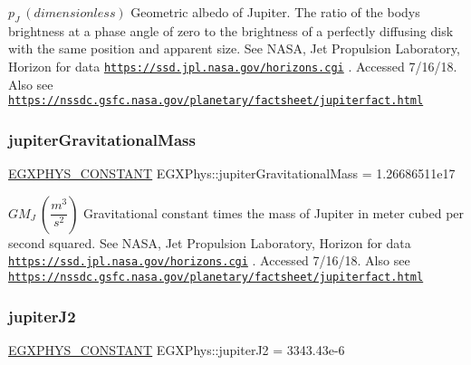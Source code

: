 $ p_{J} \ (dimensionless)$ Geometric albedo of Jupiter. The ratio of the body\textquotesingle{}s brightness at a phase angle of zero to the brightness of a perfectly diffusing disk with the same position and apparent size. See N\+A\+SA, Jet Propulsion Laboratory, Horizon for data \href{https://ssd.jpl.nasa.gov/horizons.cgi}{\tt https\+://ssd.\+jpl.\+nasa.\+gov/horizons.\+cgi} . Accessed 7/16/18. Also see \href{https://nssdc.gsfc.nasa.gov/planetary/factsheet/jupiterfact.html}{\tt https\+://nssdc.\+gsfc.\+nasa.\+gov/planetary/factsheet/jupiterfact.\+html} \mbox{\label{group___e_g_x_phys-_constants-_astrophysics-_solar_system-_jupiter-_bulk_ga6489d5b6886e19c3adf729fd28f54b46}} 
\subsubsection{\texorpdfstring{jupiter\+Gravitational\+Mass}{jupiterGravitationalMass}}
{\footnotesize\ttfamily \mbox{\hyperlink{group___e_g_x_phys-_constants-_macros_ga76980d288494ce1714c9ac68a95ba702}{E\+G\+X\+P\+H\+Y\+S\+\_\+\+C\+O\+N\+S\+T\+A\+NT}} E\+G\+X\+Phys\+::jupiter\+Gravitational\+Mass = 1.\+26686511e17}

$ GM_{J} \ (\dfrac{m^3}{s^2})$ Gravitational constant times the mass of Jupiter in meter cubed per second squared. See N\+A\+SA, Jet Propulsion Laboratory, Horizon for data \href{https://ssd.jpl.nasa.gov/horizons.cgi}{\tt https\+://ssd.\+jpl.\+nasa.\+gov/horizons.\+cgi} . Accessed 7/16/18. Also see \href{https://nssdc.gsfc.nasa.gov/planetary/factsheet/jupiterfact.html}{\tt https\+://nssdc.\+gsfc.\+nasa.\+gov/planetary/factsheet/jupiterfact.\+html} \mbox{\label{group___e_g_x_phys-_constants-_astrophysics-_solar_system-_jupiter-_bulk_ga846f4c33b3e4089181cf11106c1a1441}} 
\subsubsection{\texorpdfstring{jupiter\+J2}{jupiterJ2}}
{\footnotesize\ttfamily \mbox{\hyperlink{group___e_g_x_phys-_constants-_macros_ga76980d288494ce1714c9ac68a95ba702}{E\+G\+X\+P\+H\+Y\+S\+\_\+\+C\+O\+N\+S\+T\+A\+NT}} E\+G\+X\+Phys\+::jupiter\+J2 = 3343.\+43e-\/6}


